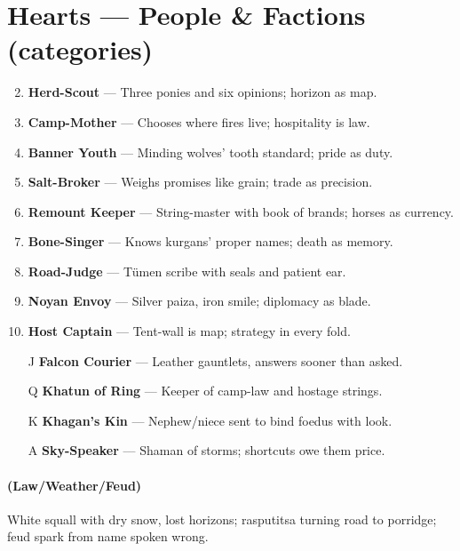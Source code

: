 \section*{Hearts --- People \& Factions (categories)}
\label{sec:ykrul-people}
\begin{enumerate}
\setcounter{enumi}{1}
\item \textbf{Herd-Scout} --- Three ponies and six opinions; horizon as map.
\item \textbf{Camp-Mother} --- Chooses where fires live; hospitality is law.
\item \textbf{Banner Youth} --- Minding wolves' tooth standard; pride as duty.
\item \textbf{Salt-Broker} --- Weighs promises like grain; trade as precision.
\item \textbf{Remount Keeper} --- String-master with book of brands; horses as currency.
\item \textbf{Bone-Singer} --- Knows kurgans' proper names; death as memory.
\item \textbf{Road-Judge} --- Tümen scribe with seals and patient ear.
\item \textbf{Noyan Envoy} --- Silver paiza, iron smile; diplomacy as blade.
\item \textbf{Host Captain} --- Tent-wall is map; strategy in every fold.
\item[J] \textbf{Falcon Courier} --- Leather gauntlets, answers sooner than asked.
\item[Q] \textbf{Khatun of Ring} --- Keeper of camp-law and hostage strings.
\item[K] \textbf{Khagan's Kin} --- Nephew/niece sent to bind foedus with look.
\item[A] \textbf{Sky-Speaker} --- Shaman of storms; shortcuts owe them price.
\end{enumerate}

\paragraph*{(Law/Weather/Feud)} White squall with dry snow, lost horizons; rasputitsa turning road to porridge; feud spark from name spoken wrong.

